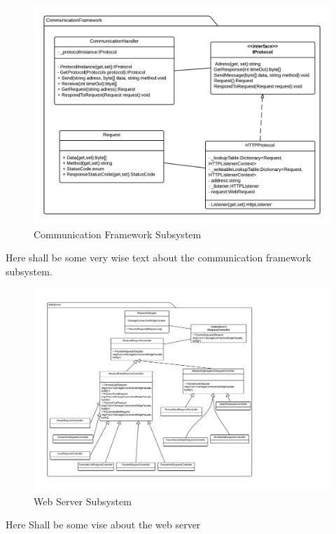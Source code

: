 \begin{figure}[H]
\includegraphics[scale=0.2]{img/SDD/CommunicationFrameworkSubsystem.png}
\caption{Communication Framework Subsystem}
\label{fig:CommunicationFramework}
\end{figure}
Here shall be some very wise text about the communication framework subsystem.


\begin{figure}[H]
\includegraphics[scale=0.2]{img/SDD/NewWebserverSubsystem.png}
\caption{Web Server Subsystem}
\label{fig:WebServer}
\end{figure}
Here Shall be some vise about the web server



